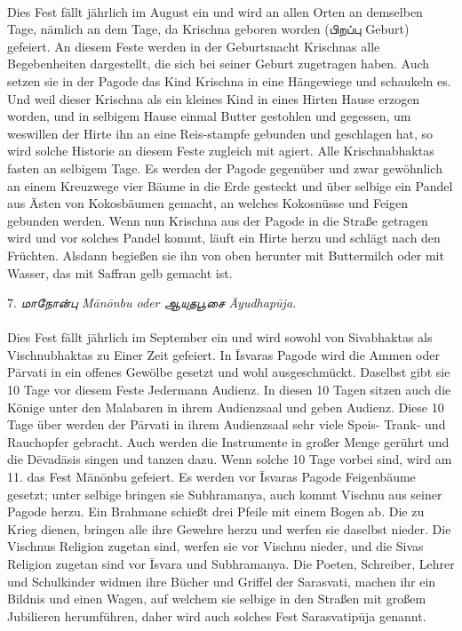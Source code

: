 \documentclass{article}
\newcommand{\TamilText}[1]{\texttamil{#1}}
\newcommand{\tam}[1]{\TamilText{#1}}
\begin{document}
\paragraph{}
Dies Fest fällt jährlich im August ein und wird an allen Orten an demselben Tage, nämlich an dem Tage, da Krischna geboren worden (\tam{பிறப்பு} Geburt) gefeiert. An diesem Feste werden in der Geburtsnacht Krischnas alle Begebenheiten dargestellt, die sich bei seiner Geburt zugetragen haben. Auch setzen sie in der Pagode das Kind Krischna in eine Hängewiege und schaukeln es. Und weil dieser Krischna als ein kleines Kind in eines Hirten Hause erzogen worden, und in selbigem Hause einmal Butter gestohlen und gegessen, um weswillen der Hirte ihn an eine Reis-stampfe gebunden und geschlagen hat, so wird solche Historie an diesem Feste zugleich mit agiert. Alle Krischnabhaktas fasten an selbigem Tage. Es werden der Pagode gegenüber und zwar gewöhnlich an einem Kreuzwege vier Bäume in die Erde gesteckt und über selbige ein Pandel aus Ästen von Kokosbäumen gemacht, an welches Kokosnüsse und Feigen gebunden werden. Wenn nun Krischna aus der Pagode in die Straße getragen wird und vor solches Pandel kommt, läuft ein Hirte herzu und schlägt nach den Früchten. Alsdann begießen sie ihn von oben herunter mit Buttermilch oder mit Wasser, das mit Saffran gelb gemacht ist.

\begin{center}
7. \emph{\tam{மாநோன்பு} M\={a}n\={o}nbu oder \tam{ஆயுதபூசை} \={A}yudhap\={u}ja.}
\end{center}
\paragraph{}
Dies Fest fällt jährlich im September ein und wird sowohl von Sivabhaktas als Vischnubhaktas zu Einer Zeit gefeiert. In \={I}svaras Pagode wird die Ammen oder P\={a}rvati in ein offenes Gewölbe gesetzt und wohl ausgeschmückt. Daselbst gibt sie 10 Tage vor diesem Feste Jedermann Audienz. In diesen 10 Tagen sitzen auch die Könige unter den Malabaren in ihrem Audienzsaal und geben Audienz. Diese 10 Tage über werden der P\={a}rvati in ihrem Audienzsaal sehr viele Speis- Trank- und Rauchopfer gebracht. Auch werden die Instrumente in großer Menge gerührt und die D\={e}vad\={a}sis singen und tanzen dazu. Wenn solche 10 Tage vorbei sind, wird am 11. das Fest M\={a}n\={o}nbu gefeiert. Es werden vor \={I}svaras Pagode Feigenbäume gesetzt; unter selbige bringen sie Subhramanya, auch kommt Vischnu aus seiner Pagode herzu. Ein Brahmane schießt drei Pfeile mit einem Bogen ab. Die zu Krieg dienen, bringen alle ihre Gewehre herzu und werfen sie daselbst nieder. Die Vischnus Religion zugetan sind, werfen sie vor Vischnu nieder, und die Sivas Religion zugetan sind vor \={I}svara und Subhramanya. Die Poeten, Schreiber, Lehrer und Schulkinder widmen ihre Bücher und Griffel der Sarasvati, machen ihr ein Bildnis und einen Wagen, auf welchem sie selbige in den Straßen mit großem Jubilieren herumführen, daher wird auch solches Fest Sarasvatip\={u}ja genannt.
\end{document}
